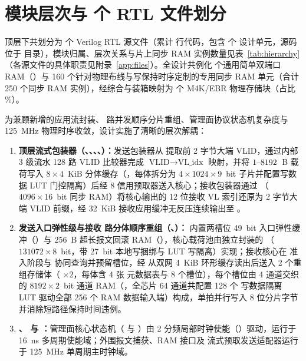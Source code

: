 \FloatBarrier
\section{模块层次与 \RtlFileCount{} 个 RTL 文件划分}

 顶层下共划分为 \RtlFileCount{} 个 Verilog RTL 源文件（累计 \RtlLineCount{} 行代码，包含 \DesignUnitCount{} 个  设计单元，源码位于  目录），模块归属、层次关系与片上同步 RAM 实例数量见表~\ref{tab:hierarchy}（各源文件的具体职责见附录~\ref{app:files}）。全设计共例化 \RamSdpCount{} 个通用简单双端口 RAM（）与 160 个针对物理布线与写保持时序定制的专用同步 RAM 单元（合计 250 个同步 RAM 实例），经综合与装箱映射为 \Mem{} 个 M4K/EBR 物理存储块（占比 \MemPct\%）。

为兼顾新增的应用流封装、\ReasmContexts{} 路并发顺序分片重组、管理面协议状态机复杂度与 125~MHz 物理时序收敛，设计实施了清晰的层次解耦：
\begin{enumerate}[leftmargin=2em,itemsep=1pt]
  \item \textbf{顶层流式包装器（、、、、）：}发送包装器从  提取前 2 字节大端 VLID，通过内部 3 级流水 128 路 VLID 比较器完成 $\text{VLID}\rightarrow\text{VL\_idx}$ 映射，并将 $1\text{--}8192$~B 载荷写入 $8\times 4$~KiB 分体缓存（，每体拆分为 $4\times 1024\times 9$~bit 子片并配置写数据 LUT 门控隔离）后经  8 信用预取器送入核心；接收包装器通过 （$4096\times 16$~bit 同步 RAM）将核心输出的 12 位接收 VL 索引还原为 2 字节大端 VLID 前缀，经 32~KiB 接收应用缓冲无反压连续输出至 。
  \item \textbf{发送入口弹性级与接收 \ReasmContexts{} 路分体顺序重组（、）：} 内置两槽位 49~bit 入口弹性缓冲（）与 256~B 超长报文回滚 RAM（），核心载荷池由独立封装的 （$131072\times 8$~bit，带 27~bit 本地写捆绑与 LUT 写隔离）实现；接收核心在  准入阶段与  协同查询并预留槽位，经  从双网 4~KiB 环形缓存读出后送入 2 个重组存储体（ $\times 2$，每体含 4 张  元数据表与 8 个槽位），每个槽位由 4 通道交织的 $8192\times 2$~bit 通道 RAM（，全芯片 64 通道共配置 128 个  写数据隔离 LUT 驱动全部 256 个 RAM 数据输入端）构成，单拍并行写入 8 位分片字节并消除短路径保持时间违例。
  \item \textbf{、 与 ：}管理面核心状态机（ 与 ）由 2 分频局部时钟使能（）驱动，运行于 16~ns 多周期使能域；外围报文捕获、RAM 接口及  流式预取发送适配器运行于 125~MHz 单周期主时钟域。
\end{enumerate}


